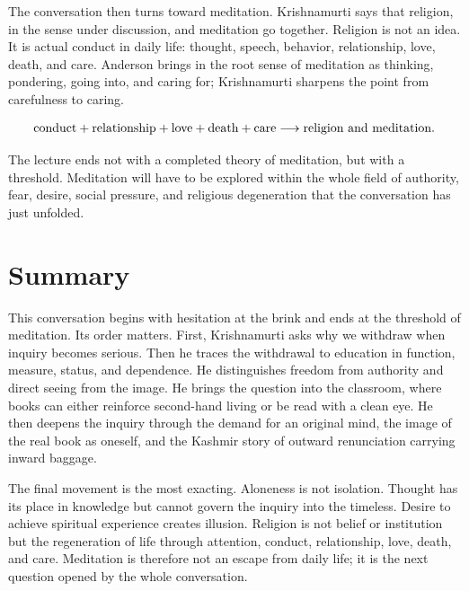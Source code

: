 The conversation then turns toward meditation. Krishnamurti says that religion, in the sense under discussion, and meditation go together. Religion is not an idea. It is actual conduct in daily life: thought, speech, behavior, relationship, love, death, and care. Anderson brings in the root sense of meditation as thinking, pondering, going into, and caring for; Krishnamurti sharpens the point from carefulness to caring.

\begin{align}
\hbox{conduct} + \hbox{relationship} + \hbox{love} + \hbox{death} + \hbox{care}
\longrightarrow \hbox{religion and meditation}.
\end{align}

The lecture ends not with a completed theory of meditation, but with a threshold. Meditation will have to be explored within the whole field of authority, fear, desire, social pressure, and religious degeneration that the conversation has just unfolded.

\section{Summary}

This conversation begins with hesitation at the brink and ends at the threshold of meditation. Its order matters. First, Krishnamurti asks why we withdraw when inquiry becomes serious. Then he traces the withdrawal to education in function, measure, status, and dependence. He distinguishes freedom from authority and direct seeing from the image. He brings the question into the classroom, where books can either reinforce second-hand living or be read with a clean eye. He then deepens the inquiry through the demand for an original mind, the image of the real book as oneself, and the Kashmir story of outward renunciation carrying inward baggage.

The final movement is the most exacting. Aloneness is not isolation. Thought has its place in knowledge but cannot govern the inquiry into the timeless. Desire to achieve spiritual experience creates illusion. Religion is not belief or institution but the regeneration of life through attention, conduct, relationship, love, death, and care. Meditation is therefore not an escape from daily life; it is the next question opened by the whole conversation.